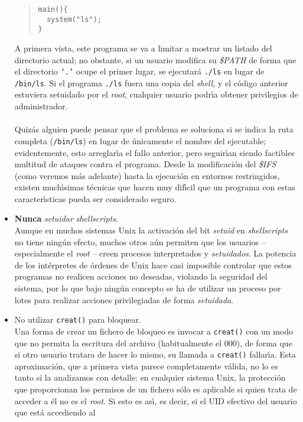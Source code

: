 \begin{itemize}
\begin{quote}
\begin{verbatim}
main(){
  system("ls");
}
\end{verbatim}
\end{quote}
A primera vista, este programa se va a limitar a mostrar un listado del
directorio actual; no obstante, si un usuario modifica su {\it \$PATH} de forma
que el directorio {\tt `.'} ocupe el primer lugar, se ejecutar\'a {\tt ./ls}
en lugar de {\tt /bin/ls}. Si el programa {\tt ./ls} fuera una copia del {\it 
shell}, y el c\'odigo anterior estuviera setuidado por el {\it root}, cualquier 
usuario podr\'{\i}a obtener privilegios de administrador.\\
\\Quiz\'as alguien puede pensar que el problema se soluciona si se indica la
ruta completa ({\tt /bin/ls}) en lugar de \'unicamente el nombre del ejecutable;
evidentemente, esto arreglar\'{\i}a el fallo anterior, pero seguir\'{\i}an
siendo factibles multitud de ataques contra el programa. Desde la modificaci\'on
del {\it \$IFS} (como veremos m\'as adelante) hasta la ejecuci\'on en entornos 
restringidos, existen 
much\'{\i}simas t\'ecnicas que hacen muy dif\'{\i}cil que un programa con estas 
caracter\'{\i}sticas pueda ser considerado seguro.
\item {\bf Nunca} {\it setuidar} {\it shellscripts}.\\
Aunque en muchos sistemas Unix la activaci\'on del bit {\it setuid} en {\it 
shellscripts} no tiene ning\'un efecto, muchos otros a\'un permiten que los
usuarios -- especialmente el {\it root} -- creen procesos interpretados y {\it
setuidados}. La potencia de los int\'erpretes de \'ordenes de Unix hace casi
imposible controlar que estos programas no realicen acciones no deseadas, 
violando la seguridad del sistema, por lo que bajo ning\'un concepto se ha de
utilizar un proceso por lotes para realizar acciones privilegiadas de forma
{\it setuidada}.
\item No utilizar {\tt creat()} para bloquear.\\
Una forma de crear un fichero de bloqueo es invocar a {\tt creat()} con un
modo que no permita la escritura del archivo (habitualmente el 000), de forma 
que si otro usuario tratara de hacer lo mismo, su llamada a {\tt creat()} 
fallar\'{\i}a. Esta aproximaci\'on, que a primera vista parece completamente
v\'alida, no lo es tanto si la analizamos con detalle: en cualquier sistema
Unix, la protecci\'on que proporcionan los permisos de un fichero s\'olo es
aplicable si quien trata de acceder a \'el no es el {\it root}. Si esto es 
as\'{\i}, es decir, si el UID efectivo del usuario que est\'a accediendo al

\end{itemize}

